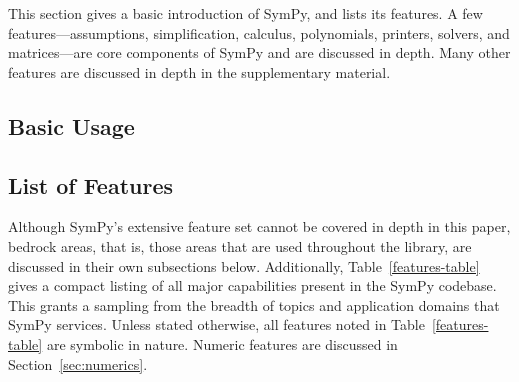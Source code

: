 This section gives a basic introduction of SymPy, and lists its features.
A few features---assumptions, simplification, calculus, polynomials, printers,
solvers, and matrices---are core components of SymPy and are discussed in
depth. Many other features are discussed in depth in the supplementary
material.

\subsection{Basic Usage}
\label{sec:basic-usage}


\subsection{List of Features}

Although SymPy's extensive feature set cannot be covered in depth in this
paper, bedrock areas, that is, those areas that are used throughout the
library, are discussed in their own
subsections below. Additionally, Table~\ref{features-table} gives a compact listing
of all major capabilities present in the SymPy codebase. This grants a
sampling from the breadth of topics and application domains that SymPy
services. Unless stated otherwise, all features noted in
Table~\ref{features-table} are symbolic in nature. Numeric features are
discussed in Section~\ref{sec:numerics}.

